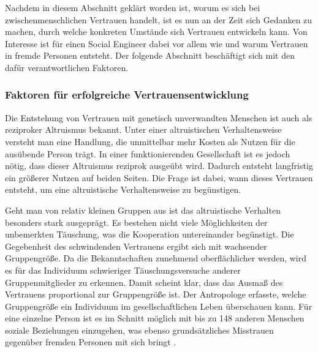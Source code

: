 Nachdem in diesem Abschnitt geklärt worden ist, worum es sich bei zwischenmenschlichen Vertrauen handelt, ist es nun an der Zeit sich Gedanken zu machen, durch welche konkreten Umstände sich Vertrauen entwickeln kann.
Von Interesse ist für einen Social Engineer dabei vor allem wie und warum Vertrauen in fremde Personen entsteht.
Der folgende Abschnitt beschäftigt sich mit den dafür verantwortlichen Faktoren.

\subsubsection{Faktoren für erfolgreiche Vertrauensentwicklung}
Die Entstehung von Vertrauen mit genetisch unverwandten Menschen ist auch als reziproker Altruismus bekannt.
Unter einer altruistischen Verhaltensweise versteht man eine Handlung, die unmittelbar mehr Kosten als Nutzen für die ausübende Person trägt.
In einer funktionierenden Gesellschaft ist es jedoch nötig, dass dieser Altruismus reziprok ausgeübt wird. Dadurch entsteht langfristig ein größerer Nutzen auf beiden Seiten.
Die Frage ist dabei, wann dieses Vertrauen entsteht, um eine altruistische Verhaltensweise zu begünstigen.

Geht man von relativ kleinen Gruppen aus ist das altruistische Verhalten besonders stark ausgeprägt. Es bestehen nicht viele Möglichkeiten der unbemerkten Täuschung, was die Kooperation untereinander begünstigt.
Die Gegebenheit des schwindenden Vertrauens ergibt sich mit wachsender Gruppengröße.
Da die Bekanntschaften zunehmend oberflächlicher werden, wird es für das Individuum schwieriger Täuschungsversuche anderer Gruppenmitglieder zu erkennen.
Damit scheint klar, dass das Ausmaß des Vertrauens proportional zur Gruppengröße ist.
Der Antropologe  erfasste, welche Gruppengröße ein Individuum im gesellschaftlichen Leben überschauen kann.
Für eine einzelne Person ist es im Schnitt möglich mit bis zu 148 anderen Menschen soziale Beziehungen einzugehen, was ebenso grundsätzliches Misstrauen gegenüber fremden Personen mit sich bringt \citep{dunbar2010how}.


